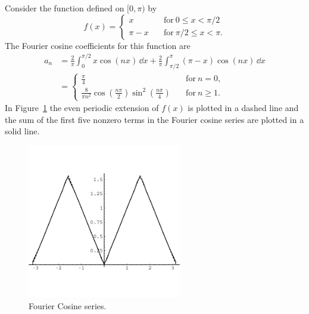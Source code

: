 \begin{Example}
  Consider the function defined on $[0, \pi)$ by
  \[ f(x) = 
  \begin{cases}
    x \quad &\mathrm{for}\ 0 \leq x < \pi/2 \\
    \pi - x \quad &\mathrm{for}\ \pi/2 \leq x < \pi.
  \end{cases}
  \]
  The Fourier cosine coefficients for this function are
  \begin{align*}
    a_n     &= \frac{2}{\pi} \int_0^{\pi/2} x \cos(n x)\,\dd x
    + \frac{2}{\pi} \int_{\pi/2}^\pi (\pi - x)\cos(n x)\,\dd x \\
    &=      \begin{cases}
      \frac{\pi}{4} \quad &\mathrm{for}\ n = 0, \\
      \frac{8}{\pi n^2} \cos\left(\frac{n\pi}{2}\right)
      \sin^2\left(\frac{n\pi}{4}\right)
      \quad &\mathrm{for}\ n \geq 1.
    \end{cases}
  \end{align*}
  In Figure~\ref{cos_hill_5} the even periodic extension of $f(x)$ is
  plotted in a dashed line and the sum of the first five nonzero
  terms in the Fourier cosine series are plotted in a solid line.

  \begin{figure}[h!]
    \begin{center}
      \includegraphics[width=0.6\textwidth]{ode/fourier_series/cos_h5}
    \end{center}
    \caption{Fourier Cosine series.}
    \label{cos_hill_5}
  \end{figure}
  
\end{Example}














